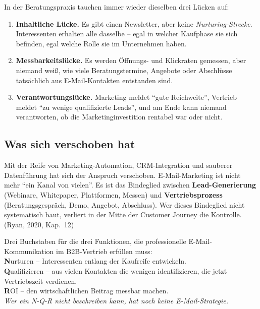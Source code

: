 \documentclass[11pt,a4paper,oneside]{article}
\newcommand{\caveatfontfallback}{\itshape}
\newcommand\caveatfont{\caveatfontfallback}%
\newcommand{\akzent}[1]{{\caveatfont\color{lpAmber}#1}}
\newcommand{\fachbegriff}[1]{\textbf{#1}}
\newcommand{\quelle}[1]{{\footnotesize\color{lpGray}(#1)}}
\begin{document}
In der Beratungspraxis tauchen immer wieder dieselben drei Lücken auf:

\begin{enumerate}
  \item \fachbegriff{Inhaltliche Lücke.} Es gibt einen Newsletter, aber keine \emph{Nurturing-Strecke}. Interessenten erhalten alle dasselbe -- egal in welcher Kaufphase sie sich befinden, egal welche Rolle sie im Unternehmen haben.
  \item \fachbegriff{Messbarkeitslücke.} Es werden Öffnungs- und Klickraten gemessen, aber niemand weiß, wie viele Beratungstermine, Angebote oder Abschlüsse tatsächlich aus E-Mail-Kontakten entstanden sind.
  \item \fachbegriff{Verantwortungslücke.} Marketing meldet ``gute Reichweite'', Vertrieb meldet ``zu wenige qualifizierte Leads'', und am Ende kann niemand verantworten, ob die Marketinginvestition rentabel war oder nicht.
\end{enumerate}

\subsection{Was sich verschoben hat}

Mit der Reife von Marketing-Automation, CRM-Integration und sauberer Datenführung hat sich der Anspruch verschoben. E-Mail-Marketing ist nicht mehr ``ein Kanal von vielen''. Es ist das Bindeglied zwischen \fachbegriff{Lead-Generierung} (Webinare, Whitepaper, Plattformen, Messen) und \fachbegriff{Vertriebsprozess} (Beratungsgespräch, Demo, Angebot, Abschluss). Wer dieses Bindeglied nicht systematisch baut, verliert in der Mitte der Customer Journey die Kontrolle. \quelle{Ryan, 2020, Kap.~12}

\begin{eselsbox}[Eselsbrücke: \akzent{N-Q-R}]
Drei Buchstaben für die drei Funktionen, die professionelle E-Mail-Kommunikation im B2B-Vertrieb erfüllen muss:\\[2pt]
\textbf{N}urturen -- Interessenten entlang der Kaufreife entwickeln.\\
\textbf{Q}ualifizieren -- aus vielen Kontakten die wenigen identifizieren, die jetzt Vertriebszeit verdienen.\\
\textbf{R}OI -- den wirtschaftlichen Beitrag messbar machen.\\[2pt]
\emph{Wer ein N-Q-R nicht beschreiben kann, hat noch keine E-Mail-Strategie.}
\end{eselsbox}
\end{document}

